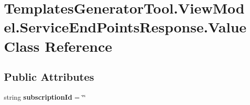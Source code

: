 \hypertarget{class_templates_generator_tool_1_1_view_model_1_1_service_end_points_response_1_1_value}{}\section{Templates\+Generator\+Tool.\+View\+Model.\+Service\+End\+Points\+Response.\+Value Class Reference}
\label{class_templates_generator_tool_1_1_view_model_1_1_service_end_points_response_1_1_value}
\subsection*{Public Attributes}
\begin{DoxyCompactItemize}
\item 
\mbox{\label{class_templates_generator_tool_1_1_view_model_1_1_service_end_points_response_1_1_value_a283dfd40444d79055c057cd5c88eedf3}} 
string {\bfseries subscription\+Id} = \char`\"{}\char`\"{}
\end{DoxyCompactItemize}
